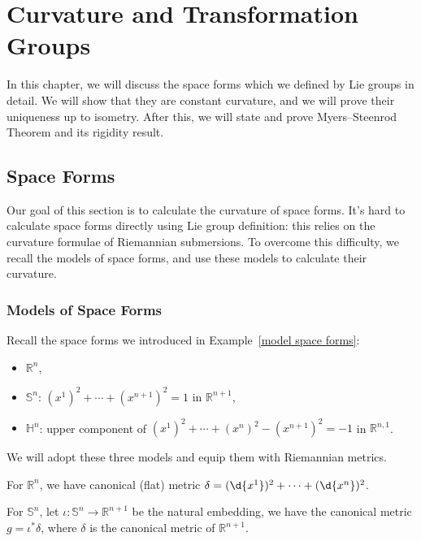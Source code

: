 \chapter{Curvature and Transformation Groups}

In this chapter, we will discuss the space forms which we defined by Lie groups in detail.
We will show that they are constant curvature, and we will prove their uniqueness up to isometry.
After this, we will state and prove Myers--Steenrod Theorem and its rigidity result.

\section{Space Forms}

Our goal of this section is to calculate the curvature of space forms.
It's hard to calculate space forms directly using Lie group definition: this relies on the curvature formulae of Riemannian submersions.
To overcome this difficulty, we recall the models of space forms, and use these models to calculate their curvature.

\subsection*{Models of Space Forms}

Recall the space forms we introduced in Example~\ref{model space forms}:
\begin{itemize}
    \item $\mathbb{R}^n$,
    \item $\mathbb{S}^n$: $(x^1)^2+\cdots+(x^{n+1})^2=1$ in $\mathbb{R}^{n+1}$,
    \item $\mathbb{H}^n$: upper component of $(x^1)^2+\cdots+(x^n)^2-(x^{n+1})^2=-1$ in $\mathbb{R}^{n,1}$.
\end{itemize}
We will adopt these three models and equip them with Riemannian metrics.

For $\mathbb{R}^n$, we have canonical (flat) metric $\delta=(\d{x^1})^2+\cdots+(\d{x^n})^2$.

For $\mathbb{S}^n$, let $\iota:\mathbb{S}^n\to\mathbb{R}^{n+1}$ be the natural embedding, we have the canonical metric $g=\iota^*\delta$, where $\delta$ is the canonical metric of $\mathbb{R}^{n+1}$.

